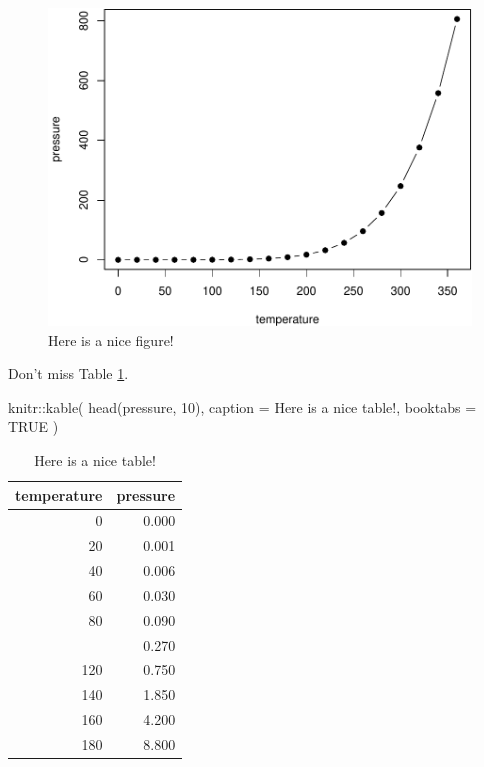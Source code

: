 \documentclass[
]{book}
\makeatletter
\newenvironment{Shaded}{\begin{snugshade}}{\end{snugshade}}
\newcommand{\AttributeTok}[1]{\textcolor[rgb]{0.77,0.63,0.00}{#1}}
\newcommand{\ConstantTok}[1]{\textcolor[rgb]{0.00,0.00,0.00}{#1}}
\newcommand{\DecValTok}[1]{\textcolor[rgb]{0.00,0.00,0.81}{#1}}
\newcommand{\FunctionTok}[1]{\textcolor[rgb]{0.00,0.00,0.00}{#1}}
\newcommand{\NormalTok}[1]{#1}
\newcommand{\SpecialCharTok}[1]{\textcolor[rgb]{0.00,0.00,0.00}{#1}}
\newcommand{\StringTok}[1]{\textcolor[rgb]{0.31,0.60,0.02}{#1}}
\newenvironment{kframe}{%
\medskip{}
\setlength{\fboxsep}{.8em}
 \def\at@end@of@kframe{}%
 \ifinner\ifhmode%
  \def\at@end@of@kframe{\end{minipage}}%
  \begin{minipage}{\columnwidth}%
 \fi\fi%
 \def\FrameCommand##1{\hskip\@totalleftmargin \hskip-\fboxsep
 \colorbox{shadecolor}{##1}\hskip-\fboxsep
     \hskip-\linewidth \hskip-\@totalleftmargin \hskip\columnwidth}%
 \MakeFramed {\advance\hsize-\width
   \@totalleftmargin\z@ \linewidth\hsize
   \@setminipage}}%
 {\par\unskip\endMakeFramed%
 \at@end@of@kframe}
\renewenvironment{Shaded}{\begin{kframe}}{\end{kframe}}
\theoremstyle{definition}
\theoremstyle{definition}
\theoremstyle{definition}
\theoremstyle{definition}
\theoremstyle{remark}
\makeatother
\begin{document}
\begin{figure}[t]

{\centering \includegraphics[width=0.8\linewidth]{figures/nice-fig-1} 

}

\caption{Here is a nice figure!}\label{fig:nice-fig}
\end{figure}

Don't miss Table \ref{tab:nice-tab}.

\begin{Shaded}
\begin{Highlighting}[]
\NormalTok{knitr}\SpecialCharTok{::}\FunctionTok{kable}\NormalTok{(}
  \FunctionTok{head}\NormalTok{(pressure, }\DecValTok{10}\NormalTok{), }\AttributeTok{caption =} \StringTok{\textquotesingle{}Here is a nice table!\textquotesingle{}}\NormalTok{,}
  \AttributeTok{booktabs =} \ConstantTok{TRUE}
\NormalTok{)}
\end{Highlighting}
\end{Shaded}

\begin{table}

\caption{\label{tab:nice-tab}Here is a nice table!}
\centering
\begin{tabular}[t]{rr}
\toprule
temperature & pressure\\
\midrule
0 & 0.000\\
20 & 0.001\\
40 & 0.006\\
60 & 0.030\\
80 & 0.090\\
\addlinespace
100 & 0.270\\
120 & 0.750\\
140 & 1.850\\
160 & 4.200\\
180 & 8.800\\
\bottomrule
\end{tabular}
\end{table}
\end{document}
